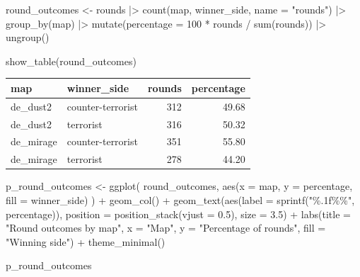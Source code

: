 \documentclass[
  letterpaper,
  DIV=11,
  numbers=noendperiod]{scrartcl}
\newenvironment{Shaded}{\begin{snugshade}}{\end{snugshade}}
\newcommand{\AttributeTok}[1]{\textcolor[rgb]{0.40,0.45,0.13}{#1}}
\newcommand{\DecValTok}[1]{\textcolor[rgb]{0.68,0.00,0.00}{#1}}
\newcommand{\FloatTok}[1]{\textcolor[rgb]{0.68,0.00,0.00}{#1}}
\newcommand{\FunctionTok}[1]{\textcolor[rgb]{0.28,0.35,0.67}{#1}}
\newcommand{\NormalTok}[1]{\textcolor[rgb]{0.00,0.23,0.31}{#1}}
\newcommand{\OtherTok}[1]{\textcolor[rgb]{0.00,0.23,0.31}{#1}}
\newcommand{\SpecialCharTok}[1]{\textcolor[rgb]{0.37,0.37,0.37}{#1}}
\newcommand{\StringTok}[1]{\textcolor[rgb]{0.13,0.47,0.30}{#1}}
\newcounter{none} %
\begin{document}
\begin{Shaded}
\begin{Highlighting}[]
\NormalTok{round\_outcomes }\OtherTok{\textless{}{-}}\NormalTok{ rounds }\SpecialCharTok{|\textgreater{}}
  \FunctionTok{count}\NormalTok{(map, winner\_side, }\AttributeTok{name =} \StringTok{"rounds"}\NormalTok{) }\SpecialCharTok{|\textgreater{}}
  \FunctionTok{group\_by}\NormalTok{(map) }\SpecialCharTok{|\textgreater{}}
  \FunctionTok{mutate}\NormalTok{(}\AttributeTok{percentage =} \DecValTok{100} \SpecialCharTok{*}\NormalTok{ rounds }\SpecialCharTok{/} \FunctionTok{sum}\NormalTok{(rounds)) }\SpecialCharTok{|\textgreater{}}
  \FunctionTok{ungroup}\NormalTok{()}

\FunctionTok{show\_table}\NormalTok{(round\_outcomes)}
\end{Highlighting}
\end{Shaded}

{\def\LTcaptype{none} %
\begin{longtable}[]{@{}llrr@{}}
\toprule\noalign{}
map & winner\_side & rounds & percentage \\
\midrule\noalign{}
\endhead
\bottomrule\noalign{}
\endlastfoot
de\_dust2 & counter-terrorist & 312 & 49.68 \\
de\_dust2 & terrorist & 316 & 50.32 \\
de\_mirage & counter-terrorist & 351 & 55.80 \\
de\_mirage & terrorist & 278 & 44.20 \\
\end{longtable}
}

\begin{Shaded}
\begin{Highlighting}[]
\NormalTok{p\_round\_outcomes }\OtherTok{\textless{}{-}} \FunctionTok{ggplot}\NormalTok{(}
\NormalTok{  round\_outcomes, }\FunctionTok{aes}\NormalTok{(}\AttributeTok{x =}\NormalTok{ map, }\AttributeTok{y =}\NormalTok{ percentage, }\AttributeTok{fill =}\NormalTok{ winner\_side)}
\NormalTok{) }\SpecialCharTok{+}
  \FunctionTok{geom\_col}\NormalTok{() }\SpecialCharTok{+}
  \FunctionTok{geom\_text}\NormalTok{(}\FunctionTok{aes}\NormalTok{(}\AttributeTok{label =} \FunctionTok{sprintf}\NormalTok{(}\StringTok{"\%.1f\%\%"}\NormalTok{, percentage)),}
            \AttributeTok{position =} \FunctionTok{position\_stack}\NormalTok{(}\AttributeTok{vjust =} \FloatTok{0.5}\NormalTok{), }\AttributeTok{size =} \FloatTok{3.5}\NormalTok{) }\SpecialCharTok{+}
  \FunctionTok{labs}\NormalTok{(}\AttributeTok{title =} \StringTok{"Round outcomes by map"}\NormalTok{, }\AttributeTok{x =} \StringTok{"Map"}\NormalTok{,}
       \AttributeTok{y =} \StringTok{"Percentage of rounds"}\NormalTok{, }\AttributeTok{fill =} \StringTok{"Winning side"}\NormalTok{) }\SpecialCharTok{+}
  \FunctionTok{theme\_minimal}\NormalTok{()}

\NormalTok{p\_round\_outcomes}
\end{Highlighting}
\end{Shaded}
\end{document}
